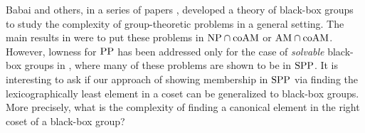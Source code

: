 \documentclass{article}
\newcommand{\PP}{\mbox{\rm PP}}
\newcommand{\NP}{\mbox{\rm NP}}
\newcommand{\SPP}{\mbox{\rm SPP}}
\newcommand{\AM}{\mbox{\rm AM}}
\newcommand{\coAM}{\mbox{\rm coAM}}
\begin{document}
Babai and others, in a series of papers \cite{babai85matrix,
  babai88arthur, babai92bounded}, developed a theory of black-box
groups to study the complexity of group-theoretic problems in a
general setting. The main results in \cite{babai85matrix,
  babai88arthur, babai92bounded} were to put these problems in
$\NP\cap\coAM$ or $\AM\cap\coAM$. However, lowness for $\PP$ has been
addressed only for the case of \emph{solvable} black-box groups in
\cite{arvind97solvable,vinodchandran97improved}, where many of these
problems are shown to be in $\SPP$. It is interesting to ask if our
approach of showing membership in $\SPP$ via finding the
lexicographically least element in a coset can be generalized to
black-box groups. More precisely, what is the complexity of finding a
canonical element in the right coset of a black-box group?



\end{document}
